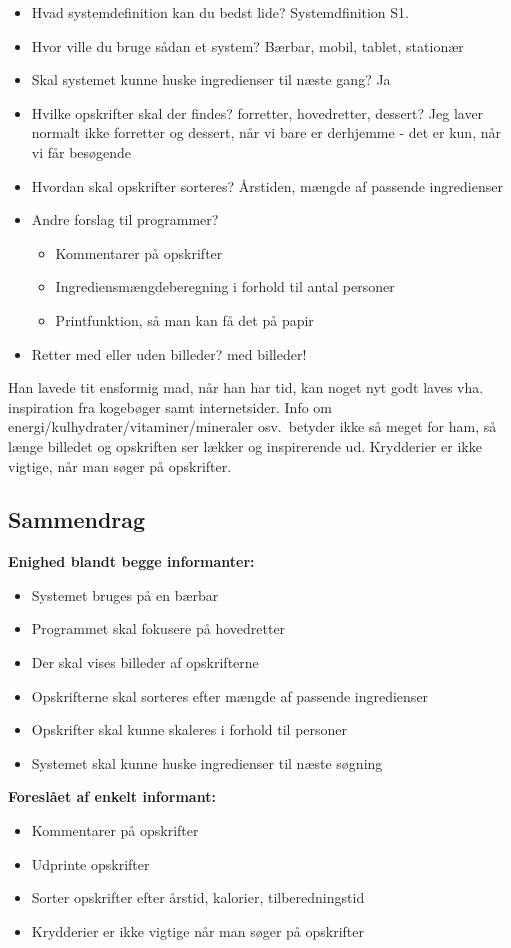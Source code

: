 \begin{description}
\begin{itemize}[noitemsep]
  \item Hvad systemdefinition kan du bedst lide? Systemdfinition S1.
  \item Hvor ville du bruge sådan et system? Bærbar, mobil, tablet, stationær
  \item Skal systemet kunne huske ingredienser til næste gang? Ja
  \item Hvilke opskrifter skal der findes? forretter, hovedretter, dessert? Jeg laver normalt ikke forretter og dessert, når vi bare er derhjemme - det er kun, når vi får besøgende
  \item Hvordan skal opskrifter sorteres? Årstiden, mængde af passende ingredienser
  \item Andre forslag til programmer?
    \begin{itemize}[noitemsep]
      \item Kommentarer på opskrifter
      \item Ingrediensmængdeberegning i forhold til antal personer
      \item Printfunktion, så man kan få det på papir
    \end{itemize}
  \item Retter med eller uden billeder? med billeder!
\end{itemize}

Han lavede tit ensformig mad, når han har tid, kan noget nyt godt laves vha. inspiration fra kogebøger samt internetsider. Info om energi/kulhydrater/vitaminer/mineraler osv.\ betyder ikke så meget for ham, så længe billedet og opskriften ser lækker og inspirerende ud. Krydderier er ikke vigtige, når man søger på opskrifter.
\end{description}

\subsection{Sammendrag}

\textbf{Enighed blandt begge informanter:}
\begin{itemize}[noitemsep]
  \item Systemet bruges på en bærbar
  \item Programmet skal fokusere på hovedretter
  \item Der skal vises billeder af opskrifterne
  \item Opskrifterne skal sorteres efter mængde af passende ingredienser
  \item Opskrifter skal kunne skaleres i forhold til personer
  \item Systemet skal kunne huske ingredienser til næste søgning
\end{itemize} 

\textbf{Foreslået af enkelt informant:}
\begin{itemize}[noitemsep]
\item Kommentarer på opskrifter
\item Udprinte opskrifter
\item Sorter opskrifter efter årstid, kalorier, tilberedningstid
\item Krydderier er ikke vigtige når man søger på opskrifter
\end{itemize}
